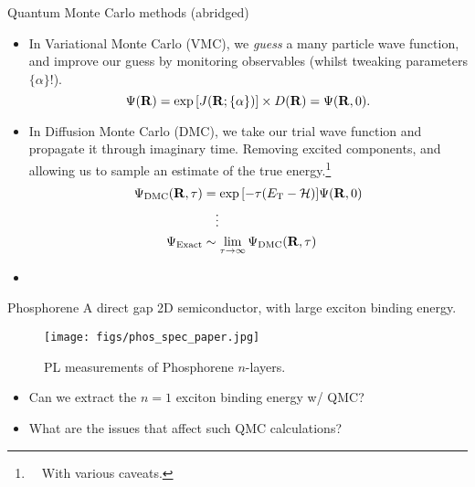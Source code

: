 \documentclass[10pt, pdf, hyperref={draft}, usenames, dvipsnames]{beamer}
\newcommand{\red}[1]{{\bf\color{LancsRed}{#1}}}
\begin{document}
\begin{frame}{Quantum Monte Carlo methods (abridged)}

\begin{itemize}

  \item  In Variational Monte Carlo (VMC), we \textit{guess} a many particle
  wave function, and improve our guess by monitoring observables (whilst
  tweaking parameters $\{\alpha\}$!).
  \begin{equation}
    \Psi({\bf R}) = \exp{[J({\bf R}; \{\alpha\})]} \times D({\bf R}) =
    \Psi({\bf R},0).
  \end{equation}

  \item In Diffusion Monte Carlo (DMC), we take our trial wave function and
  propagate it through imaginary time. Removing excited components, and
  allowing us to sample an estimate of the true energy.\footnote{~~With various
  caveats.}
  \begin{align}
    \Psi_{\text{DMC}}({\bf R},\tau) &= \exp{[-\tau(E_{\rm
    T}-\mathcal{H})]}\Psi({\bf R},0) \\ &~~~\vdots \nonumber \\
    \Psi_{\text{Exact}} &\sim \lim_{\tau \rightarrow \infty}
    \Psi_{\text{DMC}}({\bf R},\tau)
  \end{align}

  \item \red{People don't generally do this because it requires the use of
  supercomputers.}

\end{itemize}

\end{frame}

\begin{frame}{Phosphorene}
A direct gap 2D semiconductor, with large exciton binding
energy.

\begin{figure}[H]
  \centering
  \texttt{[image: figs/phos\_spec\_paper.jpg]}
  \caption{PL measurements of Phosphorene $n$-layers.\footnotemark}
\label{fig:phos_spec_paper}
\end{figure}

\begin{itemize}
  \item Can we extract the $n=1$ exciton binding energy w/ QMC?
  \item What are the issues that affect such QMC calculations?
\end{itemize}
\end{frame}
\end{document}
